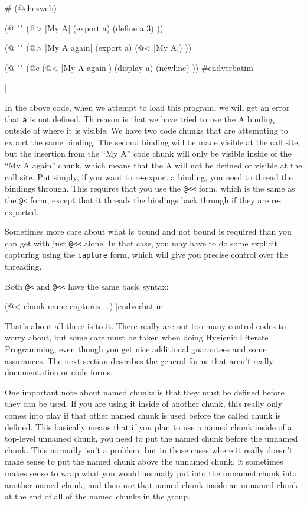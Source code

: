 \verbatimescapechar \#
\medskip\verbatim
(@chezweb)

(@ ""
(@> |My A| (export a)
(define a 3)
))

(@ ""
(@> |My A again| (export a)
(@< |My A|)
))

(@ ""
(@c
(@< |My A again|)
(display a) (newline)
))
#endverbatim
\medskip

\verbatimescapechar |

\noindent
In the above code, when we attempt to load this program, we will get
an error that {\tt a} is not defined.  Th reason is that we have tried
to use the A binding outside of where it is visible.  We have two code
chunks that are attempting to export the same binding.  The second
binding will be made visible at the call site, but the insertion from
the ``My A'' code chunk will only be visible inside of the ``My A
again'' chunk, which means that the A will not be defined or visible
at the call site.  Put simply, if you want to re-export a binding, you
need to thread the bindings through.  This requires that you use the
{\tt @<<} form, which is the same as the {\tt @<} form, except that it
threads the bindings back through if they are re-exported.

Sometimes more care about what is bound and not bound is required than
you can get with just {\tt @<<} alone.  In that case, you may have to
do some explicit capturing using the {\tt capture} form, which will
give you precise control over the threading.

Both {\tt @<} and {\tt @<<} have the same basic syntax:

\medskip\verbatim
(@< chunk-name captures ...)
|endverbatim
\medskip

\noindent
That's about all there is to it.  There really are not too many
control codes to worry about, but some care must be taken when doing
Hygienic Literate Programming, even though you get nice additional
guarantees and some assurances.  The next section describes the
general forms that aren't really documentation or code forms.

One important note about named chunks is that they must be defined
before they can be used.  If you are using it inside of another chunk,
this really only comes into play if that other named chunk is used
before the called chunk is defined.  This basically means that if you
plan to use a named chunk inside of a top-level unnamed chunk, you
need to put the named chunk before the unnamed chunk.  This normally
isn't a problem, but in those cases where it really doesn't make sense
to put the named chunk above the unnamed chunk, it sometimes makes
sense to wrap what you would normally put into the unnamed chunk into
another named chunk, and then use that named chunk inside an unnamed
chunk at the end of all of the named chunks in the group.

